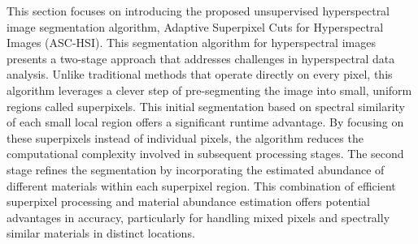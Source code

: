 This section focuses on introducing the proposed unsupervised hyperspectral image segmentation algorithm, Adaptive Superpixel Cuts for Hyperspectral Images (ASC-HSI). This segmentation algorithm for hyperspectral images presents a two-stage approach that addresses challenges in hyperspectral data analysis. Unlike traditional methods that operate directly on every pixel, this algorithm leverages a clever step of pre-segmenting the image into small, uniform regions called superpixels. This initial segmentation based on spectral similarity of each small local region offers a significant runtime advantage. By focusing on these superpixels instead of individual pixels, the algorithm reduces the computational complexity involved in subsequent processing stages. The second stage refines the segmentation by incorporating the estimated abundance of different materials within each superpixel region. This combination of efficient superpixel processing and material abundance estimation offers potential advantages in accuracy, particularly for handling mixed pixels and spectrally similar materials in distinct locations. 

  
